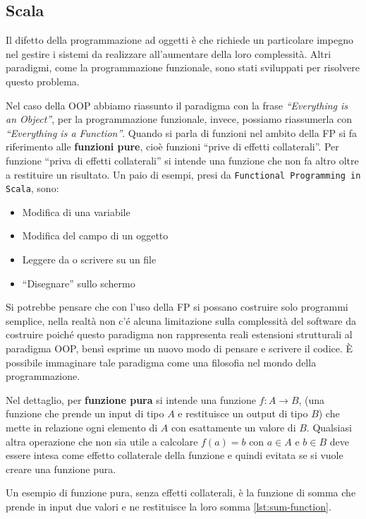 \documentclass[12pt,a4paper,openright,twoside]{book}
\begin{document}
\subsection{Scala}

Il difetto della programmazione ad oggetti è che richiede un particolare impegno nel gestire i sistemi da realizzare all'aumentare della loro complessità. Altri paradigmi, come la programmazione funzionale, sono stati sviluppati per risolvere questo problema.

Nel caso della OOP abbiamo riassunto il paradigma con la frase \textit{``Everything is an Object''}, per la programmazione funzionale, invece, possiamo riassumerla con \textit{``Everything is a Function''}. Quando si parla di funzioni nel ambito della \ac{FP} si fa riferimento alle \textbf{funzioni pure}\cite{Hunt2018}, cioè funzioni ``prive di effetti collaterali''. Per funzione ``priva di effetti collaterali'' si intende una funzione che non fa altro oltre a restituire un risultato. Un paio di esempi, presi da \texttt{Functional Programming in Scala}, sono:

\begin{itemize}
    \item Modifica di una variabile
    \item Modifica del campo di un oggetto
    \item Leggere da o scrivere su un file
    \item ``Disegnare'' sullo schermo
\end{itemize}

Si potrebbe pensare che con l'uso della \ac{FP} si possano costruire solo programmi semplice, nella realtà non c'é alcuna limitazione sulla complessità del software da costruire poiché questo paradigma non rappresenta reali estensioni strutturali al paradigma \ac{OOP}, bensì esprime un nuovo modo di pensare e scrivere il codice. È possibile immaginare tale paradigma come una filosofia nel mondo della programmazione.

\label{sec:fp}
Nel dettaglio, per \textbf{funzione pura} si intende una funzione $f:A\to B$, (una funzione che prende un input di tipo $A$ e restituisce un output di tipo $B$) che mette in relazione ogni elemento di $A$ con esattamente un valore di $B$. Qualsiasi altra operazione che non sia utile a calcolare $f(a)=b$ con $a\in A$ e $b\in B$ deve essere intesa come effetto collaterale della funzione e quindi evitata se si vuole creare una funzione pura.

Un esempio di funzione pura, senza effetti collaterali, è la funzione di somma che prende in input due valori e ne restituisce la loro somma \cref{lst:sum-function}. 
\end{document}
